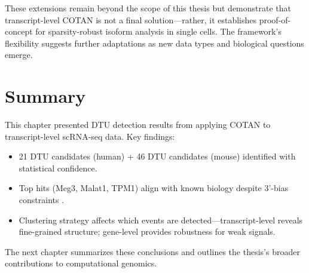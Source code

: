 These extensions remain beyond the scope of this thesis but demonstrate that transcript-level COTAN is not a final solution---rather, it establishes proof-of-concept for sparsity-robust isoform analysis in single cells. The framework's flexibility suggests further adaptations as new data types and biological questions emerge.

\section*{Summary}

This chapter presented DTU detection results from applying COTAN to transcript-level scRNA-seq data. Key findings:
\begin{itemize}
    \item 21 DTU candidates (human) + 46 DTU candidates (mouse) identified with statistical confidence.
    \item Top hits (Meg3, Malat1, TPM1) align with known biology despite 3'-bias constraints \cite{ghanam2023malat1, xue2012specialized}.
    \item Clustering strategy affects which events are detected---transcript-level reveals fine-grained structure; gene-level provides robustness for weak signals.
\end{itemize}

The next chapter summarizes these conclusions and outlines the thesis's broader contributions to computational genomics.